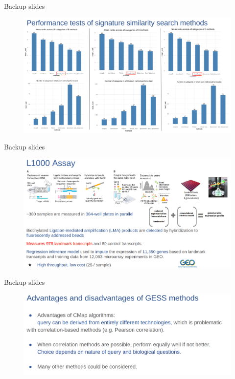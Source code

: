 \documentclass[10pt]{beamer}
\begin{document}
\begin{frame}[fragile]{Backup slides}
    \begin{figure}
        \includegraphics[width=12cm]{demo/images/gess_test_3_lincs_score.png}
    \end{figure}
\end{frame}
\begin{frame}[fragile]{Backup slides}
    \begin{figure}
        \includegraphics[width=12cm]{demo/images/l1000_assay.png}
    \end{figure}
\end{frame}
\begin{frame}[fragile]{Backup slides}
    \begin{figure}
        \includegraphics[width=12cm]{demo/images/ad_disad_gess.png}
    \end{figure}
\end{frame}
\end{document}
